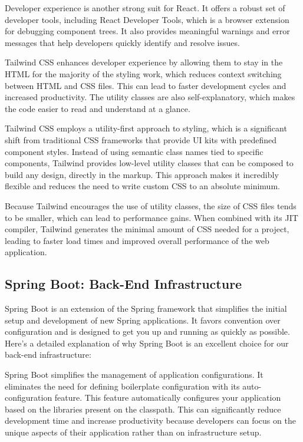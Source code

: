 Developer experience is another strong suit for React. It offers a robust set of developer tools, including React Developer Tools, which is a browser extension for debugging component trees. 
It also provides meaningful warnings and error messages that help developers quickly identify and resolve issues.

Tailwind CSS enhances developer experience by allowing them to stay in the HTML for the majority of the styling work, which reduces context switching between HTML and CSS files. 
This can lead to faster development cycles and increased productivity. The utility classes are also self-explanatory, which makes the code easier to read and understand at a glance.

Tailwind CSS employs a utility-first approach to styling, which is a significant shift from traditional CSS frameworks that provide UI kits with predefined component styles. 
Instead of using semantic class names tied to specific components, Tailwind provides low-level utility classes that can be composed to build any design, directly in the markup. This approach makes it incredibly flexible and reduces the need to write custom CSS to an absolute minimum.

Because Tailwind encourages the use of utility classes, the size of CSS files tends to be smaller, which can lead to performance gains. 
When combined with its JIT compiler, Tailwind generates the minimal amount of CSS needed for a project, leading to faster load times and improved overall performance of the web application.

\subsection{Spring Boot: Back-End Infrastructure}
Spring Boot is an extension of the Spring framework that simplifies the initial setup and development of new Spring applications. 
It favors convention over configuration and is designed to get you up and running as quickly as possible. Here's a detailed explanation of why Spring Boot is an excellent choice for our back-end infrastructure:

Spring Boot simplifies the management of application configurations. 
It eliminates the need for defining boilerplate configuration with its auto-configuration feature.
This feature automatically configures your application based on the libraries present on the classpath. 
This can significantly reduce development time and increase productivity because developers can focus on the unique aspects of their application rather than on infrastructure setup. 

